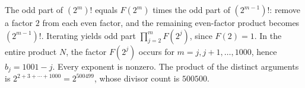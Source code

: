 The odd part of $(2^m)!$ equals $F(2^m)$ times the odd part of $(2^{m-1})!$: remove a factor $2$ from each even factor, and the remaining even-factor product becomes $(2^{m-1})!$. Iterating yields odd part $\prod_{j=2}^{m}F(2^j)$, since $F(2)=1$. In the entire product $N$, the factor $F(2^j)$ occurs for $m=j,j+1,\ldots,1000$, hence $\boxed{b_j=1001-j}$. Every exponent is nonzero. The product of the distinct arguments is $2^{2+3+\cdots+1000}=2^{500499}$, whose divisor count is $\boxed{500500}$.
